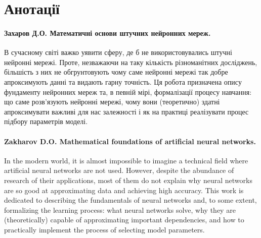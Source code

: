 \chapter*{Анотації}

\subsubsection{Захаров Д.О. Математичні основи штучних нейронних мереж.}

В сучасному світі важко уявити сферу, де б не використовувались штучні нейронні
мережі. Проте, незважаючи на таку кількість різноманітних досліджень, більшість
з них не обгрунтовують чому саме нейронні мережі так добре апроксимують данні та
видають гарну точність. Ця робота призначена опису фундаменту нейронних мереж
та, в певній мірі, формалізації процесу навчання: що саме розв'язують нейронні
мережі, чому вони (теоретично) здатні апроксимувати важливі для нас залежності і
як на практиці реалізувати процес підбору параметрів моделі.

\subsubsection{Zakharov D.O. Mathematical foundations of artificial neural networks.}

In the modern world, it is almost impossible to imagine a technical field 
where artificial neural networks are not used. However, despite the abundance
of research of their applications, most of them do not explain why neural networks
are so good at approximating data and achieving high accuracy. This work is
dedicated to describing the fundamentals of neural networks and, to some extent,
formalizing the learning process: what neural networks solve, why they are
(theoretically) capable of approximating important dependencies, and how to
practically implement the process of selecting model parameters.
